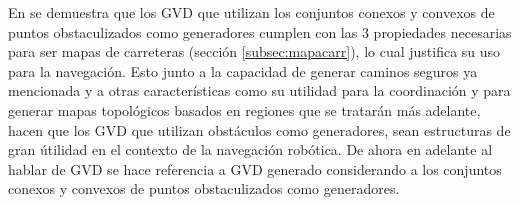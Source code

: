 
En \cite{choset2005principles} se demuestra que los GVD que utilizan los
conjuntos conexos y convexos de puntos obstaculizados como generadores cumplen
con las 3 propiedades necesarias para ser mapas de carreteras (sección
\ref{subsec:mapacarr}), lo cual justifica su uso para la navegación. Esto junto
a la capacidad de generar caminos seguros ya mencionada y a otras
características como su utilidad para la coordinación y para generar mapas
topológicos basados en regiones que se tratarán más adelante, hacen que los GVD
que utilizan obstáculos como generadores, sean estructuras de gran útilidad en
el contexto de la navegación robótica. De ahora en adelante al hablar de GVD se
hace referencia a GVD generado considerando a los conjuntos conexos y convexos
de puntos obstaculizados como generadores.


